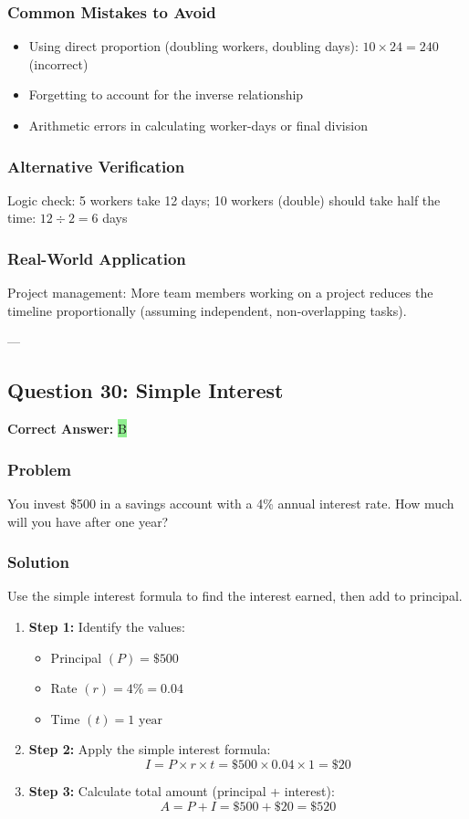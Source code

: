 \documentclass[12pt]{article}
\begin{document}
\subsubsection*{Common Mistakes to Avoid}
\begin{itemize}
\item Using direct proportion (doubling workers, doubling days): $10 \times 24 = 240$ (incorrect)
\item Forgetting to account for the inverse relationship
\item Arithmetic errors in calculating worker-days or final division
\end{itemize}

\subsubsection*{Alternative Verification}
Logic check: 5 workers take 12 days; 10 workers (double) should take half the time: $12 \div 2 = 6$ days 

\subsubsection*{Real-World Application}
Project management: More team members working on a project reduces the timeline proportionally (assuming independent, non-overlapping tasks).

---

\subsection{Question 30: Simple Interest}

\textbf{Correct Answer: } \colorbox{lightgreen}{B}

\subsubsection*{Problem}
You invest \$500 in a savings account with a 4\% annual interest rate. How much will you have after one year?

\subsubsection*{Solution}

Use the simple interest formula to find the interest earned, then add to principal.

\begin{enumerate}
\item \textbf{Step 1:} Identify the values:
  \begin{itemize}
  \item Principal $(P) = \$500$
  \item Rate $(r) = 4\% = 0.04$
  \item Time $(t) = 1 \text{ year}$
  \end{itemize}
\item \textbf{Step 2:} Apply the simple interest formula:
  \[
  I = P \times r \times t = \$500 \times 0.04 \times 1 = \$20
  \]
\item \textbf{Step 3:} Calculate total amount (principal + interest):
  \[
  A = P + I = \$500 + \$20 = \$520
  \]
\end{enumerate}
\end{document}
